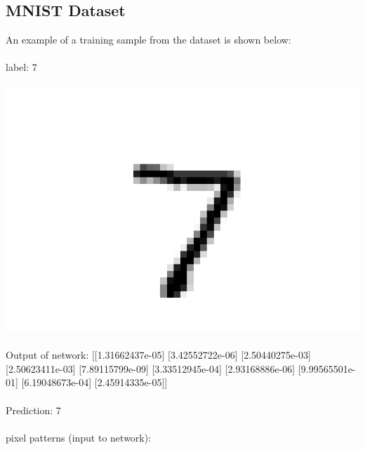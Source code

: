 \documentclass[titlepage]{article}
\begin{document}
\subsection{MNIST Dataset}
An example of a training sample from the dataset is shown below:
\\\\
label: 7
\\\\
\includegraphics[width=\linewidth]{assets/mnist_example.png}
\\\\
Output of network:
[[1.31662437e-05]
 [3.42552722e-06]
 [2.50440275e-03]
 [2.50623411e-03]
 [7.89115799e-09]
 [3.33512945e-04]
 [2.93168886e-06]
 [9.99565501e-01]
 [6.19048673e-04]
 [2.45914335e-05]]
\\\\
Prediction: 7
\\\\
pixel patterns (input to network): 
\end{document}
